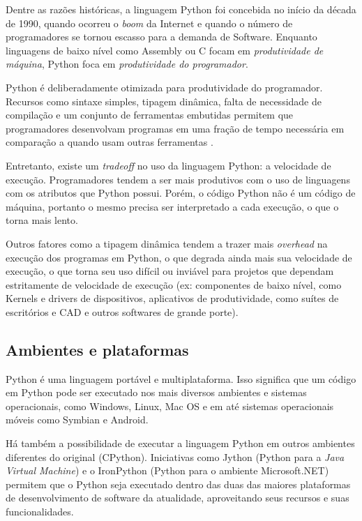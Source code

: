 Dentre as razões históricas, a linguagem Python foi concebida no início da década de 1990, quando ocorreu o \emph{boom} da Internet e quando o número de programadores se tornou escasso para a demanda de Software. Enquanto linguagens de baixo nível como Assembly ou C focam em \emph{produtividade de máquina}, Python foca em \emph{produtividade do programador}. 

Python é deliberadamente otimizada para produtividade do programador. Recursos como sintaxe simples, tipagem dinâmica, falta de necessidade de compilação e um conjunto de ferramentas embutidas permitem que programadores desenvolvam programas em uma fração de tempo necessária em comparação a quando usam outras ferramentas \cite{learningpython}. %

Entretanto, existe um \emph{tradeoff} no uso da linguagem Python: a velocidade de execução. Programadores tendem a ser mais produtivos com o uso de linguagens com os atributos que Python possui. Porém, o código Python não é um código de máquina, portanto o mesmo precisa ser interpretado a cada execução, o que o torna mais lento. 

Outros fatores como a tipagem dinâmica tendem a trazer mais \emph{overhead} na execução dos programas em Python, o que degrada ainda mais sua velocidade de execução, o que torna seu uso difícil ou inviável para projetos que dependam estritamente de velocidade de execução (ex: componentes de baixo nível, como Kernels e drivers de dispositivos, aplicativos de produtividade, como suítes de escritórios e CAD e outros softwares de grande porte).

\subsection{Ambientes e plataformas}

Python é uma linguagem portável e multiplataforma. Isso significa que um código em Python pode ser executado nos mais diversos ambientes e sistemas operacionais, como Windows, Linux, Mac OS e em até sistemas operacionais móveis como Symbian e Android.

Há também a possibilidade de executar a linguagem Python em outros ambientes diferentes do original (CPython). Iniciativas como Jython (Python para a \emph{Java Virtual Machine}) e o IronPython (Python para o ambiente Microsoft.NET) permitem que o Python seja executado dentro das duas das maiores plataformas de desenvolvimento de software da atualidade, aproveitando seus recursos e suas funcionalidades. 

